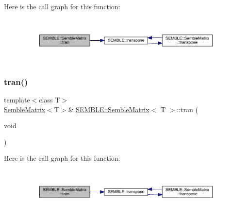Here is the call graph for this function\+:
\nopagebreak
\begin{figure}[H]
\begin{center}
\leavevmode
\includegraphics[width=350pt]{df/d87/structSEMBLE_1_1SembleMatrix_a1f306991f4b4e22697c8b1c5e1fc9d66_cgraph}
\end{center}
\end{figure}
\mbox{\label{structSEMBLE_1_1SembleMatrix_a1f306991f4b4e22697c8b1c5e1fc9d66}} 
\subsubsection{\texorpdfstring{tran()}{tran()}\hspace{0.1cm}{\footnotesize\ttfamily [2/2]}}
{\footnotesize\ttfamily template$<$class T$>$ \\
\mbox{\hyperlink{structSEMBLE_1_1SembleMatrix}{Semble\+Matrix}}$<$T$>$\& \mbox{\hyperlink{structSEMBLE_1_1SembleMatrix}{S\+E\+M\+B\+L\+E\+::\+Semble\+Matrix}}$<$ T $>$\+::tran (\begin{DoxyParamCaption}\item[{void}]{ }\end{DoxyParamCaption})\hspace{0.3cm}{\ttfamily [inline]}}

Here is the call graph for this function\+:
\nopagebreak
\begin{figure}[H]
\begin{center}
\leavevmode
\includegraphics[width=350pt]{df/d87/structSEMBLE_1_1SembleMatrix_a1f306991f4b4e22697c8b1c5e1fc9d66_cgraph}
\end{center}
\end{figure}
\mbox{\label{structSEMBLE_1_1SembleMatrix_a7e0c35ec29e619bde2f07fe9cbac56c6}} 
